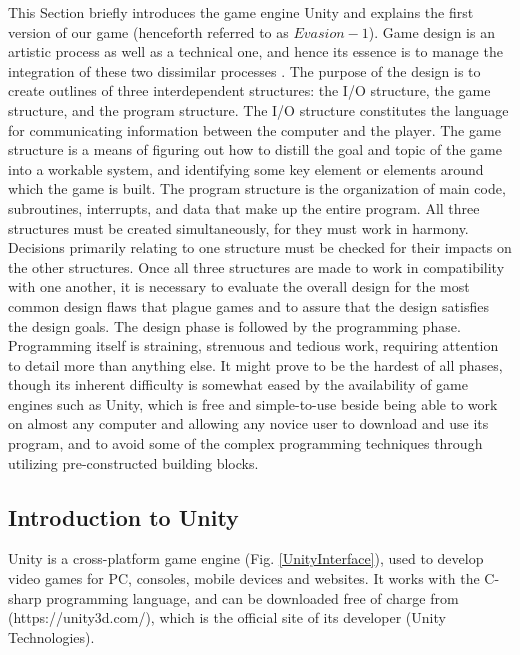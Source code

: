 This Section briefly introduces the game engine Unity and explains the first version of our game (henceforth referred to as $Evasion-1$). 
Game design is an artistic process as well as a technical one, and hence its essence is to manage the integration of these two dissimilar processes \cite{crawford1984art}. The purpose of the design is to create outlines of three interdependent structures: the I/O structure, the game structure, and the program structure. The I/O structure constitutes the language for communicating information between the computer and the player. The game structure is a means of figuring out how to distill the goal and topic of the game into a workable system, and identifying some key element or elements around which the game is built. The program structure is the organization of main code, subroutines, interrupts, and data that make up the entire program. All three structures must be created simultaneously, for they must work in harmony. Decisions primarily relating to one structure must be checked for their impacts on the other structures. Once all three structures are made to work in compatibility with one another, it is necessary to evaluate the overall design for the most common design flaws that plague games and to assure that the design satisfies the design goals. The design phase is followed by the programming phase. Programming itself is straining, strenuous and tedious work, requiring attention to detail more than anything else. It might prove to be the hardest of all phases, though its inherent difficulty is somewhat eased by the availability of game engines such as Unity, which is free and simple-to-use beside being able to work on almost any computer and allowing any novice user to download and use its program, and to avoid some of the complex programming techniques through utilizing pre-constructed building blocks.

\subsection{Introduction to Unity}

Unity is a cross-platform game engine (Fig. \ref{UnityInterface}), used to develop video games for PC, consoles, mobile devices and websites. It works with the C-sharp programming language, and can be downloaded free of charge from (https://unity3d.com/), which is the official site of its developer (Unity Technologies).


